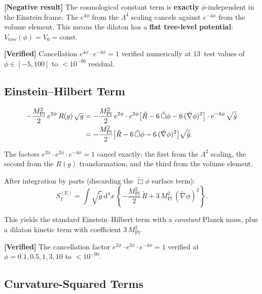\documentclass[11pt,a4paper]{article}
\renewcommand{\dd}{\mathrm{d}}
\theoremstyle{plain}
\theoremstyle{definition}
\newcommand{\verified}[1]{%
  \par\smallskip\noindent
  \colorbox{green!10}{\parbox{\dimexpr\linewidth-2\fboxsep}{%
    \textcolor{green!50!black}{\textbf{[Verified]}} #1}}%
  \par\smallskip}
\newcommand{\negresult}[1]{%
  \par\smallskip\noindent
  \colorbox{red!10}{\parbox{\dimexpr\linewidth-2\fboxsep}{%
    \textcolor{red!60!black}{\textbf{[Negative result]}} #1}}%
  \par\smallskip}
\begin{document}
\negresult{The cosmological constant term is \textbf{exactly}
$\phi$-independent in the Einstein frame.  The $e^{4\phi}$ from the
$\Lambda^4$ scaling cancels against $e^{-4\phi}$ from the volume
element.  This means the dilaton has a \textbf{flat tree-level
potential}: $V_{\mathrm{tree}}(\phi) = V_0 = \mathrm{const}$.}

\verified{Cancellation $e^{4\phi}\cdot e^{-4\phi} = 1$ verified
numerically at 13~test values of $\phi \in [-5, 100]$ to
$< 10^{-90}$ residual.}

\subsection{Einstein--Hilbert Term}

\begin{align}
  -\frac{M_{\mathrm{Pl}}^2}{2}\,e^{2\phi}\,R(g)\,\sqrt{g}
  &= -\frac{M_{\mathrm{Pl}}^2}{2}\,e^{2\phi}
  \cdot e^{2\phi}\bigl[\tilde{R} - 6\,\tilde{\Box}\phi
    - 6\,(\tilde{\nabla}\phi)^2\bigr]
  \cdot e^{-4\phi}\,\sqrt{\tilde{g}}
  \notag\\
  &= -\frac{M_{\mathrm{Pl}}^2}{2}\bigl[\tilde{R}
    - 6\,\tilde{\Box}\phi
    - 6\,(\tilde{\nabla}\phi)^2\bigr]\sqrt{\tilde{g}}.
  \label{eq:S1-einstein}
\end{align}

The factors $e^{2\phi}\cdot e^{2\phi}\cdot e^{-4\phi} = 1$ cancel
exactly: the first from the $\Lambda^2$ scaling, the second from the
$R(g)$ transformation, and the third from the volume element.

After integration by parts (discarding the $\tilde{\Box}\phi$ surface
term):
\begin{equation}\label{eq:S1-einstein-final}
  S_1^{(\mathrm{E})} = \int\!\sqrt{\tilde{g}}\,\dd^4x\,\left\{
  -\frac{M_{\mathrm{Pl}}^2}{2}\,\tilde{R}
  + 3\,M_{\mathrm{Pl}}^2\,(\tilde{\nabla}\phi)^2
  \right\}.
\end{equation}

This yields the standard Einstein--Hilbert term with a
\emph{constant} Planck mass, plus a dilaton kinetic term with
coefficient $3\,M_{\mathrm{Pl}}^2$.

\verified{The cancellation factor
$e^{2\phi}\cdot e^{2\phi}\cdot e^{-4\phi} = 1$ verified at
$\phi = 0.1, 0.5, 1, 3, 10$ to $< 10^{-90}$.}

\subsection{Curvature-Squared Terms}
\end{document}
